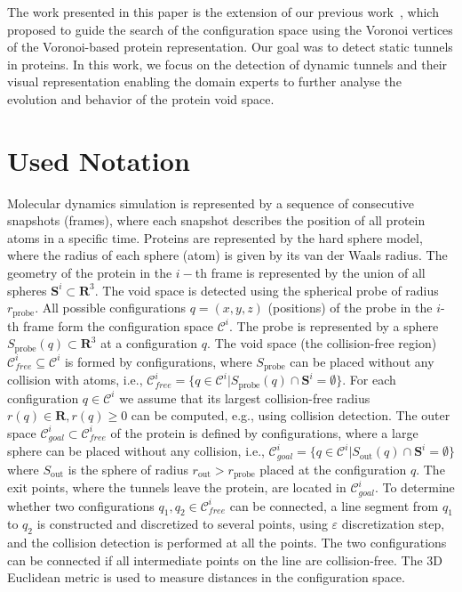 \documentclass[usletter, 10pt, conference]{svjour3}      %
\def\CG{\mathcal{C}_{goal}}
\def\C{\mathcal{C}}
\def\CF{\mathcal{C}_{free}}
\def\probe{r_{\mathrm{probe}}}
\def\Sprobe{S_{\mathrm{probe}}}
\def\gprobe{r_{\mathrm{out}}}
\def\Sgprobe{S_{\mathrm{out}}}
\def\R{\mathbf{R}}
\def\SS{\mathbf{S}}
\begin{document}
The work presented in this paper is the extension of our previous work~\cite{vonasek2017tunnel}, which proposed to guide the search
of the configuration space using the Voronoi vertices of the Voronoi-based protein representation.
Our goal was to detect static tunnels in proteins.
In this work, we focus on the detection of dynamic tunnels and their visual representation enabling the domain experts to further analyse the evolution and behavior of the protein void space.

\section{Used Notation}

Molecular dynamics simulation is represented by a sequence of consecutive snapshots (frames), where each snapshot describes the position of all protein atoms in a specific time.
Proteins are represented by the hard sphere model, where the radius of each sphere (atom) is given by its van der Waals radius.
The geometry of the protein in the $i-$th frame is represented by the union of all spheres $\SS^i \subset \R^3$.
The void space is detected using the spherical probe of radius $\probe$. 
All possible configurations $q=(x,y,z)$ (positions) of the probe in the $i$-th frame form the configuration space $\C^i$.
The probe is represented by a sphere $\Sprobe(q) \subset \R^3$ at a configuration $q$.
The void space (the collision-free region) $\CF^i \subseteq \C^i$ is formed by configurations, where $\Sprobe$ can be placed without any collision with atoms, i.e.,  $\CF^i = \{q \in \C^i | \Sprobe(q) \cap \SS^i = \emptyset\}$.
For each configuration $q\in\C^i$ we assume that its largest collision-free radius $r(q) \in \mathbf{R}, r(q)\ge 0$ can be computed, e.g., 
using collision detection.
The outer space  $\CG^i \subset \CF^i$ of the protein is defined by configurations, where a large sphere can be placed without any collision,
i.e., $\CG^i=\{q\in \C^i| \Sgprobe(q) \cap \SS^i = \emptyset \}$ where $\Sgprobe$ is the sphere of radius $\gprobe > \probe$ 
placed at the configuration $q$.
The exit points, where the tunnels leave the protein, are located in $\CG^i$.
To determine whether two configurations $q_1, q_2 \in \CF^i$ can be connected, a line segment from $q_1$ to $q_2$ is constructed
and discretized to several points, using $\varepsilon$ discretization step, and the collision detection is performed at all the points.
The two configurations can be connected if all intermediate points on the line are collision-free. 
The 3D Euclidean metric is used to measure distances in the configuration space.
\end{document}
